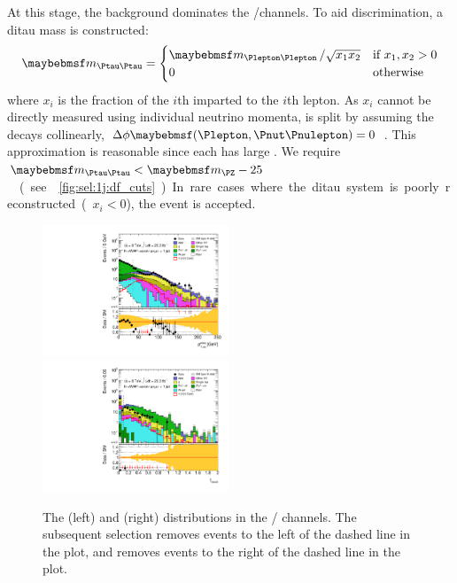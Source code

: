 At this stage, the \DYtt background dominates the \emch/\mech channels. To aid 
discrimination, a ditau mass is constructed:
\begin{equation}
	\mtautau = 
		\begin{cases}
			\mll \,/ \sqrt{x_1 x_2} &\text{if}~x_1, x_2 > 0 \\
			0 &\text{otherwise}
		\end{cases}
\end{equation}
where $x_i$ is the \pt fraction of the $i$th \Ptau imparted to the $i$th lepton. As $x_i$ 
cannot be directly measured using individual neutrino momenta, \corrtrackmet is split by 
assuming the \Ptau decays collinearly, \ie 
$\Delta\phi\parenths{\Plepton,\HepProcess{\Pnut\Pnulepton}} = 0$ \cite{Tau:collinear}. 
This approximation is reasonable since each \Ptau has large \pt. We require 
\unit{$\mtautau < \mZ - 25$}{\GeV} (see \Figure~\ref{fig:sel:1j:df_cuts}). In rare cases 
where the ditau system is poorly reconstructed (\ie $x_i < 0$), the event is accepted.

\begin{figure}[b]
	\includegraphics[width=0.495\textwidth]{tex/selection/eemm_CutTopoMll_1jet_METRel_TrackHWW_mh125_log}
	\hfill
	\includegraphics[width=0.495\textwidth]{tex/selection/eemm_CutTopoDPhill_1jet_f_recoil_ext_mh125_log}
	\caption{The \trackmetrel (left) and \frecoil (right) distributions in the \eech/\mmch 
	channels. The subsequent selection removes events to the left of the dashed line in the 
	\trackmetrel plot, and removes events to the right of the dashed line in the \frecoil 
	plot.}
	\label{fig:sel:1j:sf_cuts}
\end{figure}

